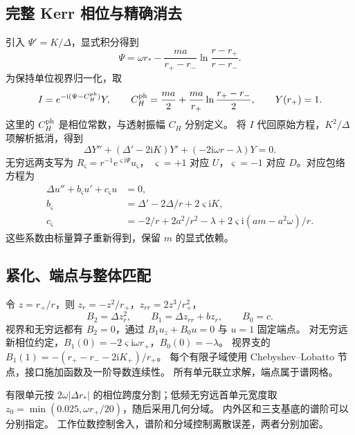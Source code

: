 \documentclass[UTF8,fontset=fandol,11pt,a4paper]{ctexart}
\newcommand{\ii}{\mathrm{i}}\newcommand{\dd}{\mathrm{d}}
\numberwithin{equation}{section}
\begin{document}
\subsection{完整 Kerr 相位与精确消去}
引入 $\Psi'=K/\Delta$，显式积分得到
\begin{equation}
\Psi=\omega r_*-\frac{ma}{r_+-r_-}\ln\frac{r-r_+}{r-r_-}.
\end{equation}
为保持单位视界归一化，取
\begin{equation}
I=e^{-\ii(\Psi-C_H^{\rm ph})}Y,\qquad
C_H^{\rm ph}=\frac{ma}{2}+\frac{ma}{r_+}\ln\frac{r_+-r_-}{2},\qquad Y(r_+)=1.
\end{equation}
这里的 $C_H^{\rm ph}$ 是相位常数，与透射振幅 $C_H$ 分别定义。
将 $I$ 代回原始方程，$K^2/\Delta$ 项解析抵消，得到
\begin{equation}
\Delta Y''+(\Delta'-2\ii K)Y'+(-2\ii\omega r-\lambda)Y=0.
\end{equation}
无穷远两支写为 $R_\varsigma=r^{-1}e^{\varsigma\ii\Psi}u_\varsigma$，
$\varsigma=+1$ 对应 $U$，$\varsigma=-1$ 对应 $D$。对应包络方程为
\begin{align}
\Delta u''+b_\varsigma u'+c_\varsigma u&=0,\\
b_\varsigma&=\Delta'-2\Delta/r+2\varsigma\ii K,\\
c_\varsigma&=-2/r+2a^2/r^2-\lambda
+2\varsigma\ii(am-a^2\omega)/r.
\end{align}
这些系数由标量算子重新得到，保留 $m$ 的显式依赖。

\subsection{紧化、端点与整体匹配}
令 $z=r_+/r$，则 $z_r=-z^2/r_+$，$z_{rr}=2z^3/r_+^2$，
\begin{equation}
B_2=\Delta z_r^2,\qquad B_1=\Delta z_{rr}+b z_r,\qquad B_0=c.
\end{equation}
视界和无穷远都有 $B_2=0$，通过 $B_1u_z+B_0u=0$ 与 $u=1$ 固定端点。
对无穷远新相位约定，$B_1(0)=-2\varsigma\ii\omega r_+$，$B_0(0)=-\lambda$。
视界支的 $B_1(1)=-(r_+-r_--2\ii K_+)/r_+$。
每个有限子域使用 Chebyshev--Lobatto 节点，接口施加函数及一阶导数连续性。
所有单元联立求解，端点属于谱网格。

有限单元按 $2\omega|\Delta r_*|$ 的相位跨度分割；低频无穷远首单元宽度取
$z_0=\min(0.025,\omega r_+/20)$，随后采用几何分域。
内外区和三支基底的谱阶可以分别指定。
工作位数控制舍入，谱阶和分域控制离散误差，两者分别加密。
\end{document}
